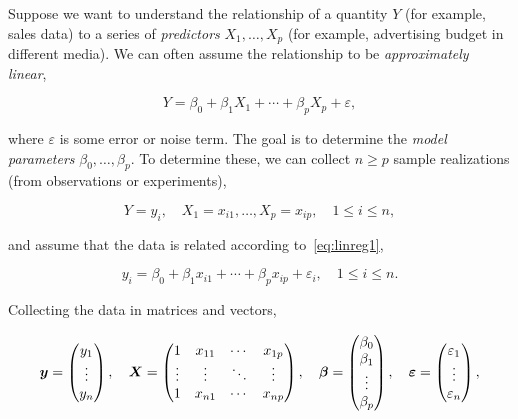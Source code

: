 \begin{example}\label{ex:1}
Suppose we want to understand the relationship of a quantity $Y$ (for example, sales data) to a series of {\em predictors} $X_1,\dots,X_p$ (for example, advertising budget in different media). We can often assume the relationship to be {\em approximately linear},

\begin{equation}\label{eq:linreg1}
 Y = \beta_0+\beta_1 X_1 + \cdots + \beta_p X_p + \varepsilon, 
\end{equation}

where $\varepsilon$ is some error or noise term. The goal is to determine the {\em model parameters} $\beta_0,\dots,\beta_p$.
To determine these, we can collect $n\geq p$ sample realizations (from observations or experiments),

\begin{equation*}
 Y=y_i, \quad X_1=x_{i1},\dots,X_p=x_{ip}, \quad 1\leq i\leq n,
\end{equation*}

and assume that the data is related according to~\eqref{eq:linreg1}, 

\begin{equation*}
 y_i = \beta_0+\beta_1x_{i1}+\cdots +\beta_p x_{ip}+\varepsilon_i, \quad 1\leq i\leq n.
\end{equation*}

Collecting the data in matrices and vectors,

\begin{equation*}
 \bm{y} = \begin{pmatrix}
            y_1\\ \vdots \\ y_n
           \end{pmatrix},
\quad \bm{X} = \begin{pmatrix} 
           1 & x_{11} & \cdots & x_{1p}\\
           \vdots & \vdots & \ddots & \vdots \\
           1 & x_{n1} & \cdots & x_{np}
          \end{pmatrix},
\quad \bm{\beta} = \begin{pmatrix}
                     \beta_0\\
                     \beta_1\\
                     \vdots\\
                     \beta_p
                    \end{pmatrix},
\quad \bm{\varepsilon} = \begin{pmatrix}
                  \varepsilon_1\\
                  \vdots\\
                  \varepsilon_n
                 \end{pmatrix},
\end{equation*}


\end{example}
